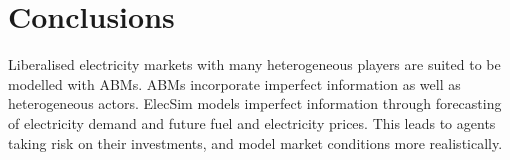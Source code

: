 \clearpage
\section{Conclusions}
\label{elecsim:sec:conclusions}


Liberalised electricity markets with many heterogeneous players are suited to be modelled with ABMs. ABMs incorporate imperfect information as well as heterogeneous actors. ElecSim models imperfect information through forecasting of electricity demand and future fuel and electricity prices. This leads to agents taking risk on their investments, and model market conditions more realistically.










